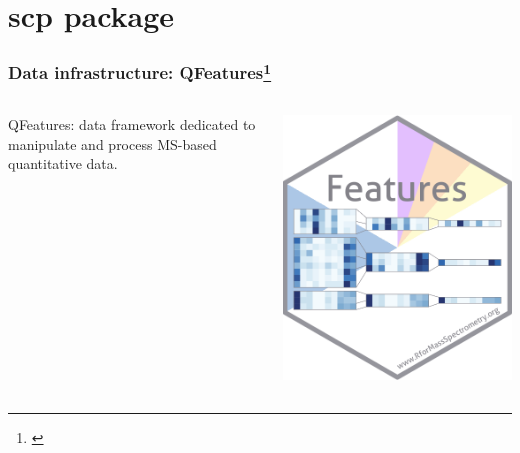 \documentclass{beamer}
\newcommand{\hcode}[2][lgray]{{\ttfamily\color{vdgray}\colorbox{#1}{#2}}}
\newcommand{\frametitlesection}[1]{\frametitle{\centering #1 \footnotesize \hspace{0pt plus 1 filll} \insertsection}}
\begin{document}
\section{scp package}

\begin{frame}
    \frametitlesection{Data infrastructure: QFeatures\footnote{\citet{QFeatures}}}

    \centering
    \begin{columns}
        \begin{column}{0.8\textwidth}
            \hcode{QFeatures}: data framework dedicated to manipulate and process
            MS-based quantitative data.
        \end{column}
        \begin{column}{0.2\textwidth}
            \includegraphics[width=\linewidth]{figs/sticker_QFeatures.png}
        \end{column}

    \end{columns}

    \bigskip


\end{frame}
\end{document}
